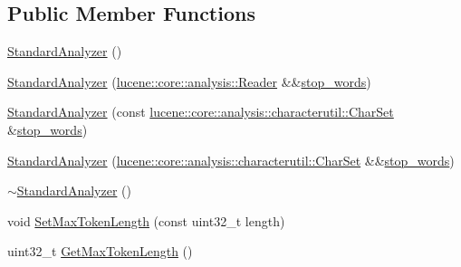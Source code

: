 \subsection*{Public Member Functions}
\begin{DoxyCompactItemize}
\item 
\mbox{\hyperlink{classlucene_1_1core_1_1analysis_1_1standard_1_1StandardAnalyzer_a96aade9f9e04262af76d6f69d5ba3103}{Standard\+Analyzer}} ()
\item 
\mbox{\hyperlink{classlucene_1_1core_1_1analysis_1_1standard_1_1StandardAnalyzer_afe3086be0798a7a38675170d12ef0d31}{Standard\+Analyzer}} (\mbox{\hyperlink{classlucene_1_1core_1_1analysis_1_1Reader}{lucene\+::core\+::analysis\+::\+Reader}} \&\&\mbox{\hyperlink{classlucene_1_1core_1_1analysis_1_1StopwordAnalyzerBase_a12ceda198e84aabe357ccd7b28e66d07}{stop\+\_\+words}})
\item 
\mbox{\hyperlink{classlucene_1_1core_1_1analysis_1_1standard_1_1StandardAnalyzer_a50b9c11d1c78184c0518fbf19c6486ce}{Standard\+Analyzer}} (const \mbox{\hyperlink{classlucene_1_1core_1_1analysis_1_1characterutil_1_1CharSet}{lucene\+::core\+::analysis\+::characterutil\+::\+Char\+Set}} \&\mbox{\hyperlink{classlucene_1_1core_1_1analysis_1_1StopwordAnalyzerBase_a12ceda198e84aabe357ccd7b28e66d07}{stop\+\_\+words}})
\item 
\mbox{\hyperlink{classlucene_1_1core_1_1analysis_1_1standard_1_1StandardAnalyzer_acc4853fc9cc1c394d9d0e8b5d0d98796}{Standard\+Analyzer}} (\mbox{\hyperlink{classlucene_1_1core_1_1analysis_1_1characterutil_1_1CharSet}{lucene\+::core\+::analysis\+::characterutil\+::\+Char\+Set}} \&\&\mbox{\hyperlink{classlucene_1_1core_1_1analysis_1_1StopwordAnalyzerBase_a12ceda198e84aabe357ccd7b28e66d07}{stop\+\_\+words}})
\item 
\mbox{\hyperlink{classlucene_1_1core_1_1analysis_1_1standard_1_1StandardAnalyzer_a241082c932a211751c3d437886d50ba0}{$\sim$\+Standard\+Analyzer}} ()
\item 
void \mbox{\hyperlink{classlucene_1_1core_1_1analysis_1_1standard_1_1StandardAnalyzer_af00b69646ec366ab9319197824f12e4b}{Set\+Max\+Token\+Length}} (const uint32\+\_\+t length)
\item 
uint32\+\_\+t \mbox{\hyperlink{classlucene_1_1core_1_1analysis_1_1standard_1_1StandardAnalyzer_a383601d5fa0bcd3883f794c887512517}{Get\+Max\+Token\+Length}} ()
\end{DoxyCompactItemize}
